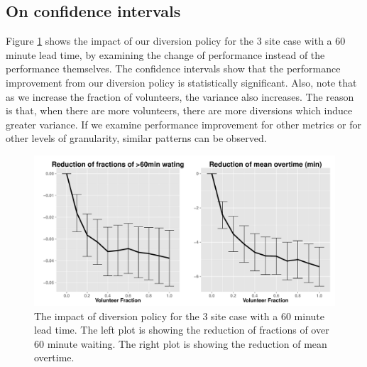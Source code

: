 \subsection{On confidence intervals}

Figure \ref{fig:ci} shows the impact of our diversion policy
for the 3 site case with a 60 minute lead time, by examining the
change of performance instead of the performance themselves.
The confidence intervals show that the performance improvement
from our diversion policy is statistically
significant. Also, note that as we increase the fraction of
volunteers, the variance also increases. The reason is that,
when there are more volunteers, there are more diversions which
induce greater variance. If we examine performance improvement
for other metrics or for other levels of granularity, similar patterns
can be observed.

\begin{figure}[htp]
\centering
\includegraphics[width=.95\textwidth]{chap3/numeric/pic/ci}
\caption{The impact of diversion policy for the 3 site case
with a 60 minute lead time. The left plot is showing the
reduction of fractions of over 60 minute waiting. The right plot
is showing the reduction of mean overtime.}
\label{fig:ci}
\end{figure}

